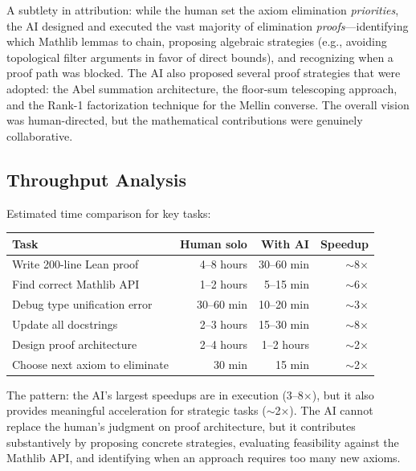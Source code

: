 \documentclass[11pt,a4paper]{article}
\begin{document}
A subtlety in attribution: while the human set the axiom elimination
\emph{priorities}, the AI designed and executed the vast majority of
elimination \emph{proofs}---identifying which Mathlib lemmas to
chain, proposing algebraic strategies (e.g., avoiding topological
filter arguments in favor of direct bounds), and recognizing when a
proof path was blocked. The AI also proposed several proof strategies
that were adopted: the Abel summation architecture, the floor-sum
telescoping approach, and the Rank-1 factorization technique for the
Mellin converse. The overall vision was human-directed, but the
mathematical contributions were genuinely collaborative.

\subsection{Throughput Analysis}

Estimated time comparison for key tasks:

\begin{center}
\begin{tabular}{@{}lrrr@{}}
\toprule
\textbf{Task} & \textbf{Human solo} & \textbf{With AI} & \textbf{Speedup} \\
\midrule
Write 200-line Lean proof & 4--8 hours & 30--60 min & $\sim$8$\times$ \\
Find correct Mathlib API & 1--2 hours & 5--15 min & $\sim$6$\times$ \\
Debug type unification error & 30--60 min & 10--20 min & $\sim$3$\times$ \\
Update all docstrings & 2--3 hours & 15--30 min & $\sim$8$\times$ \\
Design proof architecture & 2--4 hours & 1--2 hours & $\sim$2$\times$ \\
Choose next axiom to eliminate & 30 min & 15 min & $\sim$2$\times$ \\
\bottomrule
\end{tabular}
\end{center}

The pattern: the AI's largest speedups are in execution (3--8$\times$),
but it also provides meaningful acceleration for strategic tasks
($\sim$2$\times$). The AI cannot replace the human's judgment on
proof architecture, but it contributes substantively by proposing
concrete strategies, evaluating feasibility against the Mathlib API,
and identifying when an approach requires too many new axioms.

\end{document}

